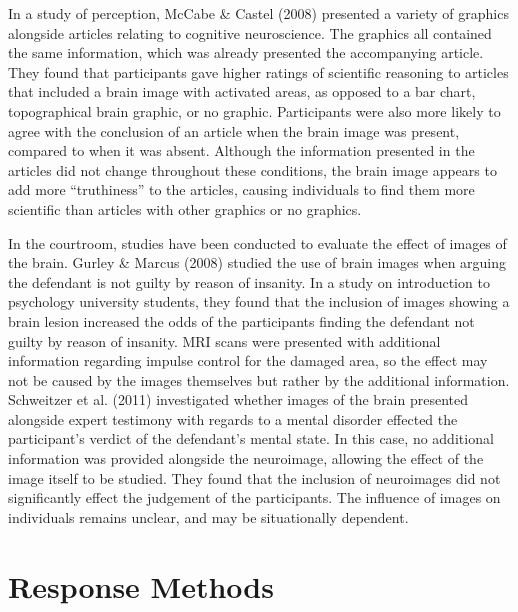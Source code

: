 \documentclass[print]{nuthesis}
\begin{document}
In a study of perception, McCabe \& Castel (2008) presented a variety of graphics alongside articles relating to cognitive neuroscience.
The graphics all contained the same information, which was already presented the accompanying article.
They found that participants gave higher ratings of scientific reasoning to articles that included a brain image with activated areas, as opposed to a bar chart, topographical brain graphic, or no graphic.
Participants were also more likely to agree with the conclusion of an article when the brain image was present, compared to when it was absent.
Although the information presented in the articles did not change throughout these conditions, the brain image appears to add more ``truthiness'' to the articles, causing individuals to find them more scientific than articles with other graphics or no graphics.

In the courtroom, studies have been conducted to evaluate the effect of images of the brain.
Gurley \& Marcus (2008) studied the use of brain images when arguing the defendant is not guilty by reason of insanity.
In a study on introduction to psychology university students, they found that the inclusion of images showing a brain lesion increased the odds of the participants finding the defendant not guilty by reason of insanity.
MRI scans were presented with additional information regarding impulse control for the damaged area, so the effect may not be caused by the images themselves but rather by the additional information.
Schweitzer et al. (2011) investigated whether images of the brain presented alongside expert testimony with regards to a mental disorder effected the participant's verdict of the defendant's mental state.
In this case, no additional information was provided alongside the neuroimage, allowing the effect of the image itself to be studied.
They found that the inclusion of neuroimages did not significantly effect the judgement of the participants.
The influence of images on individuals remains unclear, and may be situationally dependent.

\hypertarget{response-methods}{%
\section{Response Methods}\label{response-methods}}
\end{document}
